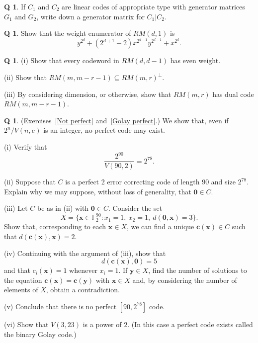 \documentclass[12pt,a4paper]{article}
\theoremstyle{plain}
\theoremstyle{definition}
\newtheorem{question}[theorem]{Q}
\begin{document}
    \begin{question}
        \label{3.5}
        If $C_{1}$ and $C_{2}$ are linear codes of appropriate
        type with generator matrices $G_{1}$ and $G_{2}$,
        write down a generator matrix for $C_{1}|C_{2}$.
    \end{question}
    \begin{question}
        \label{C3.6}
        Show that the weight enumerator
        of $RM(d,1)$ is
        \[y^{2^{d}}+(2^{d+1}-2)x^{2^{d-1}}y^{2^{d-1}}+x^{2^{d}}.\]
    \end{question}
    \begin{question}
        \label{C3.7}
        (i) Show that every codeword in $RM(d,d-1)$ has even weight.

        (ii) Show that $RM(m,m-r-1)\subseteq RM(m,r)^{\perp}$.

        (iii) By considering dimension, or otherwise, show
        that $RM(m,r)$ has dual code $RM(m,m-r-1)$.
    \end{question}
    \begin{question}
        \label{C3.8}
        (Exercises~\ref{Not perfect} and~\ref{Golay perfect}.)
        We show that,
        even if $2^{n}/V(n,e)$ is an integer,
        no perfect code may exist.

        (i) Verify that
        \[\frac{2^{90}}{V(90,2)}=2^{78}.\]

        (ii) Suppose that $C$ is a perfect 2 error correcting
        code of length $90$ and size $2^{78}$. Explain
        why we may suppose, without loss of generality,
        that ${\boldsymbol 0}\in C$.

        (iii) Let $C$ be as in (ii) with ${\boldsymbol 0}\in C$.
        Consider the set
        \[X=\{{\mathbf x}\in{\mathbb F}_{2}^{90}:
        x_{1}=1,\ x_{2}=1,\ d({\boldsymbol 0},{\mathbf x})=3\}.\]
        Show that, corresponding to each ${\mathbf x}\in X$,
        we can find a unique ${\mathbf c}({\mathbf x})\in C$
        such that $d({\mathbf c}({\mathbf x}),{\mathbf x})=2$.


        (iv) Continuing with the argument of (iii), show
        that
        \[d({\mathbf c}({\mathbf x}),{\boldsymbol 0})=5\]
        and that $c_{i}({\mathbf x})=1$ whenever $x_{i}=1$.
        If  $\mathbf{y}\in X$,
        find the number of solutions to the equation
        ${\mathbf c}({\mathbf x})={\mathbf c}({\mathbf y})$
        with $\mathbf{x}\in X$
        and, by considering the number of elements of $X$,
        obtain a contradiction.

        (v) Conclude that there is no perfect $[90,2^{78}]$ code.

        (vi) Show that $V(3,23)$ is a power of $2$. (In this case
        a perfect code exists called the binary Golay code.)
    \end{question}
\end{document}
